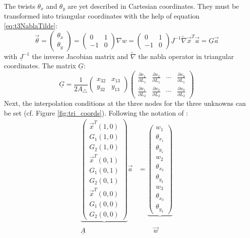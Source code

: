   The twists $\theta_x$ and $\theta_y$ are yet described in Cartesian coordinates. They must be transformed into triangular coordinates with the help of equation \ref{eq:t3NablaTilde}:
  \begin{equation}
  \vec{\theta} = \begin{pmatrix}
  \theta_x\\\theta_y
  \end{pmatrix} = \begin{pmatrix}
  0 & 1 \\ -1 & 0
  \end{pmatrix} \nabla w = \begin{pmatrix}
  0 & 1 \\ -1 & 0
  \end{pmatrix} \underline{J}^{-1} \tilde{\nabla} \vec{x}^T \vec{a} = \underline{G} \vec{a}
  \end{equation}
  with $\underline{J}^{-1}$ the inverse Jacobian matrix and $\tilde{\nabla}$ the nabla operator in triangular coordinates. The matrix $\underline{G}$:
  \begin{equation}
  \underline{G} = \frac{1}{2 A_\triangle} \begin{pmatrix}
  x_{32} & x_{13} \\ y_{32} & y_{13}
  \end{pmatrix} \begin{pmatrix}
  \frac{\partial x_1}{\partial L_1} & \frac{\partial x_2}{\partial L_1} & \cdots & \frac{\partial x_9}{\partial L_1} \\
  \frac{\partial x_1}{\partial L_2} & \frac{\partial x_2}{\partial L_2} & \cdots & \frac{\partial x_9}{\partial L_2}
  \end{pmatrix}
  \end{equation}
  Next, the interpolation conditions at the three nodes for the three unknowns can be set (cf. Figure \ref{fig:tri_coords}). Following the notation of \cite{steinke2005finite}:
  \begin{align}
  \underbrace{\begin{pmatrix}
  	\vec{x}^T(1,0)\\G_1(1,0)\\G_2(1,0)\\
  	\vec{x}^T(0,1)\\G_1(0,1)\\G_2(0,1)\\
  	\vec{x}^T(0,0)\\G_1(0,0)\\G_2(0,0)
  	\end{pmatrix}} \vec{a} &= \underbrace{\begin{pmatrix}
  	w_1\\\theta_{x_1}\\\theta_{y_1}\\
  	w_2\\\theta_{x_2}\\\theta_{y_2}\\
  	w_3\\\theta_{x_3}\\\theta_{y_3}
  	\end{pmatrix}}\\
  \underline{A}\qquad\quad &\qquad\ \vec{w}
  \end{align}
